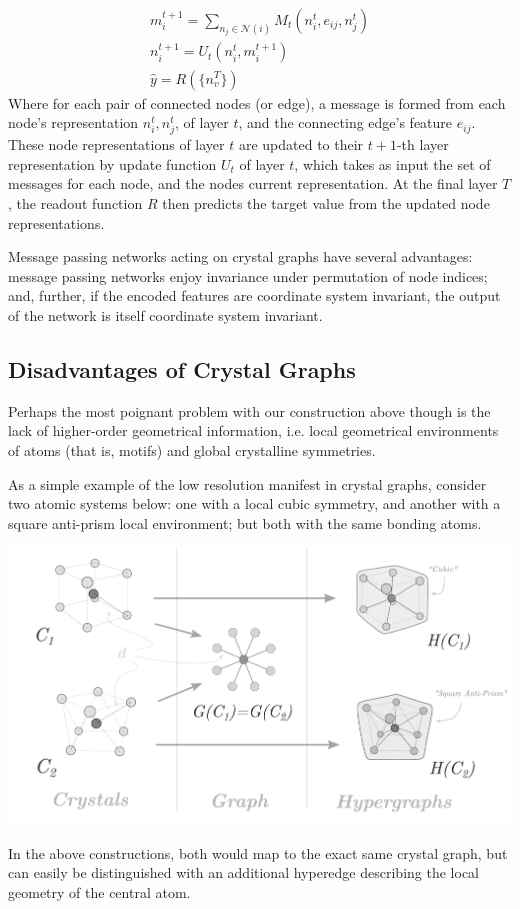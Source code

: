 \documentclass[10pt,a4paper]{article}
\begin{document}
\begin{gather*}
m_i^{t+1}=\sum_{n_j\in \mathcal{N}(i)} M_t(n_i^{t},e_{ij},n_j^t )\\
n_i^{t+1}=U_t(n_i^t,m_i^{t+1})\\
\hat{y}=R(\lbrace n_v^T\rbrace)
\end{gather*}
Where for each pair of connected nodes (or edge), a message is formed from each node's representation $n_i^t,n_j^t$, of layer $t$, and the connecting edge's feature $e_{ij}$. These  node representations of layer $t$ are updated to their $t+1$-th layer representation by update function $U_t$ of layer $t$, which takes as input the set of messages for each node, and the nodes current representation. At the final layer $T$, the readout function $R$ then predicts the target value from the updated node representations.


Message passing networks acting on crystal graphs have several advantages: message passing networks enjoy invariance under permutation of node indices; and, further, if the encoded features are coordinate system invariant, the output of the network is itself coordinate system invariant.


\subsection{Disadvantages of Crystal Graphs}
Perhaps the most poignant problem with our construction above though is the lack of higher-order geometrical information, i.e. local geometrical environments of atoms (that is, motifs) and global crystalline symmetries.

As a simple example of the low resolution manifest in crystal graphs, consider two atomic systems below: one with a local cubic symmetry, and another with a square anti-prism local environment; but both with the same bonding atoms. 
\begin{center}
\includegraphics[scale=0.63]{graph2hgraph_tall_revise.pdf}
\end{center}
In the above constructions, both would map to the exact same crystal graph, but can easily be distinguished with an additional hyperedge describing the local geometry of the central atom.
\end{document}
